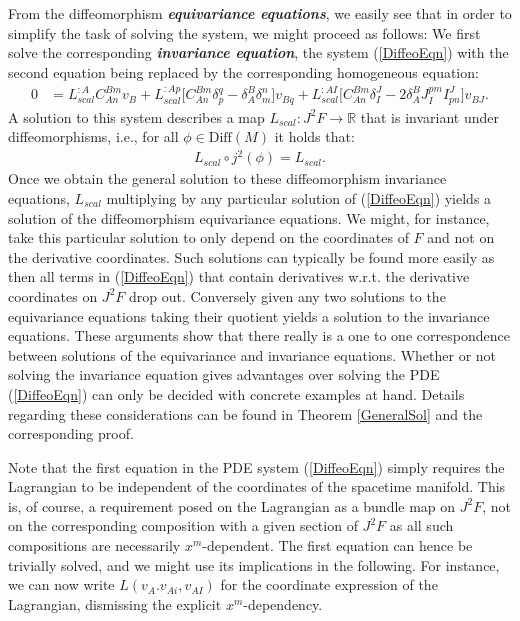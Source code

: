 From the diffeomorphism \textit{\textbf{equivariance equations}}, we easily see that in order to simplify the task of solving the system, we might proceed as follows:
We first solve the corresponding \textit{\textbf{invariance equation}}, the system (\ref{DiffeoEqn}) with the second equation being replaced by the corresponding homogeneous equation:
\begin{align}
    0 &= L_{scal}^{:A} C_{An}^{Bm} v_B + L_{scal}^{:Ap} \bigl[ C_{An}^{Bm} \delta_p^q - \delta_A^B \delta_m^n \bigr] v_{Bq} + L_{scal}^{:AI} \bigl[ C_{An}^{Bm} \delta_I^J - 2 \delta_A^B J_I^{pm} I^J_{pn}  \bigr] v_{BJ}.
\end{align}
A solution to this system describes a map $L_{scal}: J^2F \rightarrow \mathbb{R}$ that is invariant under diffeomorphisms, i.e., for all $\phi \in \mathrm{Diff}(M)$ it holds that:
\begin{align}
    L_{scal} \circ j^2(\phi) = L_{scal}.
\end{align}
Once we obtain the general solution to these diffeomorphism invariance equations, $L_{scal}$ multiplying by any particular solution of (\ref{DiffeoEqn}) yields a solution of the diffeomorphism equivariance equations. We might, for instance, take this particular solution to only depend on the coordinates of $F$ and not on the derivative coordinates. Such solutions can typically be found more easily as then all terms in (\ref{DiffeoEqn}) that contain derivatives w.r.t. the derivative coordinates on $J^2F$ drop out. Conversely given any two solutions to the equivariance equations taking their quotient yields a solution to the invariance equations. These arguments show that there really is a one to one correspondence between solutions of the equivariance and invariance equations. Whether or not solving the invariance equation gives advantages over solving the PDE (\ref{DiffeoEqn}) can only be decided with concrete examples at hand. Details regarding these considerations can be found in Theorem \ref{GeneralSol} and the corresponding proof. 

Note that the first equation in the PDE system (\ref{DiffeoEqn}) simply requires the Lagrangian to be independent of the coordinates of the spacetime manifold. This is, of course, a requirement posed on the Lagrangian as a bundle map on $J^2F$, not on the corresponding composition with a given section of $J^2F$ as all such compositions are necessarily $x^m$-dependent. The first equation can hence be trivially solved, and we might use its implications in the following. For instance, we can now write $L(v_A.v_{Ai},v_{AI})$ for the coordinate expression of the Lagrangian, dismissing the explicit $x^m$-dependency.

